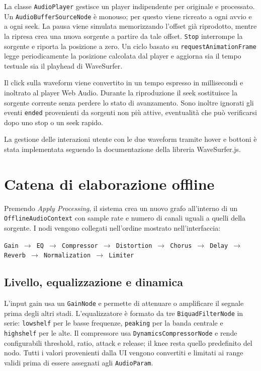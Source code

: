 \documentclass[11pt,a4paper]{article}
\begin{document}
	La classe \texttt{AudioPlayer} gestisce un player indipendente per originale e processato. \\
	Un \texttt{AudioBufferSourceNode} è monouso; per questo viene ricreato a ogni avvio e a ogni seek. La pausa viene simulata memorizzando l'offset già riprodotto, mentre la ripresa crea una nuova sorgente a partire da tale offset. \texttt{Stop} interrompe la sorgente e riporta la posizione a zero. Un ciclo basato su \texttt{requestAnimationFrame} legge periodicamente la posizione calcolata dal player e aggiorna sia il tempo testuale sia il playhead di WaveSurfer.
	
	Il click sulla waveform viene convertito in un tempo espresso in millisecondi e inoltrato al player Web Audio. Durante la riproduzione il seek sostituisce la sorgente corrente senza perdere lo stato di avanzamento. Sono inoltre ignorati gli eventi \texttt{ended} provenienti da sorgenti non più attive, eventualità che può verificarsi dopo uno stop o un seek rapido.
	
	La gestione delle interazioni utente con le due waveform tramite hover e bottoni è stata implementata seguendo la documentazione della libreria WaveSurfer.js.
	
	\section{Catena di elaborazione offline}
	
	Premendo \emph{Apply Processing}, il sistema crea un nuovo grafo all'interno di un \texttt{OfflineAudioContext} con sample rate e numero di canali uguali a quelli della sorgente. I nodi vengono collegati nell'ordine mostrato nell'interfaccia:
	
	\begin{center}
		\small
		\texttt{Gain $\rightarrow$ EQ $\rightarrow$ Compressor $\rightarrow$ Distortion $\rightarrow$ Chorus $\rightarrow$ Delay $\rightarrow$ Reverb $\rightarrow$ Normalization $\rightarrow$ Limiter}
	\end{center}
	
	\subsection{Livello, equalizzazione e dinamica}
	
	L'input gain usa un \texttt{GainNode} e permette di attenuare o amplificare il segnale prima degli altri stadi. L'equalizzatore è formato da tre \texttt{BiquadFilterNode} in serie: \texttt{lowshelf} per le basse frequenze, \texttt{peaking} per la banda centrale e \texttt{highshelf} per le alte. Il compressore usa \texttt{DynamicsCompressorNode} e rende configurabili threshold, ratio, attack e release; il knee resta quello predefinito del nodo. Tutti i valori provenienti dalla UI vengono convertiti e limitati ai range validi prima di essere assegnati agli \texttt{AudioParam}.
	
\end{document}
